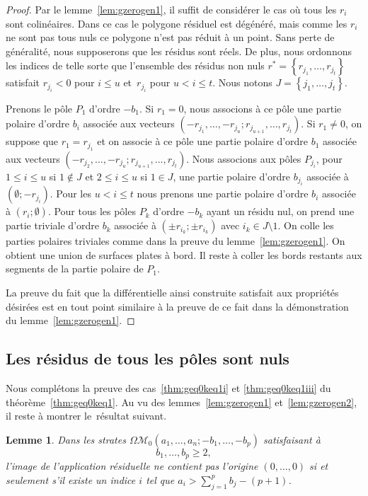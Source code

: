 \documentclass[JEP,XML,SOM,Unicode,francais,NoFloatCountersInSection,published]{cedram}
\let\mathcal\mathscr
\newcommand{\omoduli}[1][g]{{\Omega\mathcal M}_{\!#1}}
\newtheorem{lem}[thm]{Lemme}
\theoremstyle{definition}
\begin{document}
\begin{proof}
Par le lemme~\ref{lem:gzerogen1}, il suffit de considérer le cas où tous les $r_{i}$ sont colinéaires. Dans ce cas le polygone résiduel est dégénéré, mais comme les $r_{i}$ ne sont pas tous nuls ce polygone n'est pas réduit à un point. Sans perte de généralité, nous supposerons que les résidus sont réels. De plus, nous ordonnons les indices de telle sorte que l'ensemble des résidus non nuls $r^{\ast}=\left\{ r_{j_{1}},\dots,r_{j_{t}}\right\}$ satisfait $r_{j_{i}}<0$ pour $i\leq u$ et~$r_{j_{i}}$ pour $u<i\leq t$. Nous notons $J=\left\{ j_{1},\dots,j_{t}\right\}$.

Prenons le pôle $P_{1}$ d'ordre $-b_{1}$. Si $r_{1}=0$, nous associons à ce pôle une partie polaire d'ordre $b_{i}$ associée aux vecteurs $(-r_{j_{1}},\dots,-r_{j_{u}};r_{j_{u+1}},\dots,r_{j_{t}})$. Si $r_{1}\neq 0$, on suppose que $r_{1}=r_{j_{1}}$ et on associe à ce pôle une partie polaire d'ordre $b_{1}$ associée aux vecteurs $(-r_{j_{2}},\dots,-r_{j_{u}};r_{j_{u+1}},\dots,r_{j_{t}})$.
Nous associons aux pôles $P_{j_{i}}$, pour $1\leq i\leq u$ si $1\notin J$ et $2\leq i\leq u$ si $1\in J$, une partie polaire d'ordre $b_{j_{i}}$ associée à $(\emptyset;-r_{j_{i}})$. Pour les $u< i\leq t$ nous prenons une partie polaire d'ordre $b_{i}$ associée à $(r_{i};\emptyset)$. Pour tous les pôles $P_{k}$ d'ordre $-b_{k}$ ayant un résidu nul, on prend une partie triviale d'ordre $b_{k}$ associée à $(\pm r_{i_{k}};\pm r_{i_{k}})$ avec $i_{k}\in J \setminus 1$. On colle les parties polaires triviales comme dans la preuve du lemme~\ref{lem:gzerogen1}. On obtient une union de surfaces plates à bord. Il reste à coller les bords restants aux segments de la partie polaire de $P_{1}$.

La preuve du fait que la différentielle ainsi construite satisfait aux propriétés désirées est en tout point similaire à la preuve de ce fait dans la démonstration du lemme~\ref{lem:gzerogen1}.
\end{proof}

\subsection{Les résidus de tous les pôles sont nuls}
\label{sec:casreszero}
Nous complétons la preuve des cas~\eqref{thm:geq0keq1i} et \eqref{thm:geq0keq1iii} du théorème~\ref{thm:geq0keq1}. Au vu des lemmes~\ref{lem:gzerogen1} et~\ref{lem:gzerogen2}, il reste à montrer le~résultat suivant.
\begin{lem}\label{lem:condgzero}
Dans les strates $\omoduli[0](a_{1},\dots,a_{n};-b_{1},\dots,-b_{p})$ satisfaisant à
\[
b_{1},\dots,b_{p} \geq 2,
\]
l'image de l'application résiduelle ne contient pas l'origine $(0,\dots,0)$ si et seulement s'il existe un indice $i$ tel que $a_{i}>\sum_{j=1}^{p}b_{j}-(p+1)$.
\end{lem}
\end{document}
